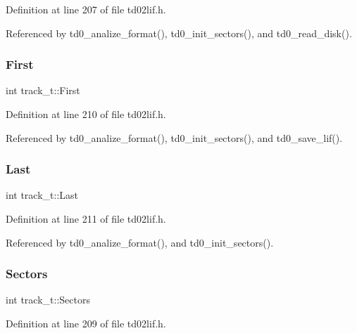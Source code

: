Definition at line 207 of file td02lif.\+h.



Referenced by td0\+\_\+analize\+\_\+format(), td0\+\_\+init\+\_\+sectors(), and td0\+\_\+read\+\_\+disk().

\mbox{\label{structtrack__t_a1ffa3863c3fb622cb158e5275c99c55c}} 
\subsubsection{\texorpdfstring{First}{First}}
{\footnotesize\ttfamily int track\+\_\+t\+::\+First}



Definition at line 210 of file td02lif.\+h.



Referenced by td0\+\_\+analize\+\_\+format(), td0\+\_\+init\+\_\+sectors(), and td0\+\_\+save\+\_\+lif().

\mbox{\label{structtrack__t_a9ebaf56b7b9c814e5e9c39dea130fa18}} 
\subsubsection{\texorpdfstring{Last}{Last}}
{\footnotesize\ttfamily int track\+\_\+t\+::\+Last}



Definition at line 211 of file td02lif.\+h.



Referenced by td0\+\_\+analize\+\_\+format(), and td0\+\_\+init\+\_\+sectors().

\mbox{\label{structtrack__t_a9a073d98f27d50ffda7991ea8099f269}} 
\subsubsection{\texorpdfstring{Sectors}{Sectors}}
{\footnotesize\ttfamily int track\+\_\+t\+::\+Sectors}



Definition at line 209 of file td02lif.\+h.



